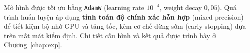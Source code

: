 Mô hình được tối ưu bằng \texttt{AdamW} (learning rate $10^{-4}$, weight decay
$0{,}05$). Quá trình huấn luyện áp dụng \textbf{tính toán độ chính xác hỗn hợp}
(mixed precision) để tiết kiệm bộ nhớ GPU và tăng tốc, kèm cơ chế dừng sớm (early
stopping) dựa trên mất mát kiểm định. Chi tiết cấu hình và kết quả được trình bày ở
Chương~\ref{chap:exp}.
